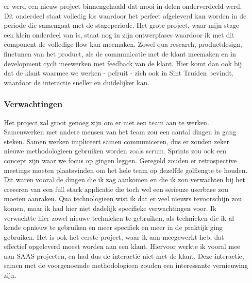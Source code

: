 er werd een nieuw project binnengehaald dat mooi in delen onderverdeeld werd. Dit
onderdeel staat volledig los waardoor het perfect afgeleverd kan worden in de periode die
samengaat met de stageperiode.
Het grote project, waar mijn stage een klein onderdeel van is, staat nog in zijn
ontwerpfases waardoor ik met dit component de volledige flow kan meemaken. Zowel qua
research, productdesign, finetunen van het product, als de communicatie met de klant
meemaken en in development cycli meewerken met feedback van de klant. Hier komt dan ook
bij dat de klant waarmee we werken - pcfruit - zich ook in Sint Truiden bevindt, waardoor
de interactie sneller en duidelijker kan.

\subsubsection {Verwachtingen}

Het project zal groot genoeg zijn om er met een team aan te werken. Samenwerken met
andere mensen van het team zou een aantal dingen in gang steken. Samen werken impliceert
samen communiceren, dus er zouden zeker nieuwe methodologieen gebruiken worden zoals
scrum. Sprints zou ook een concept zijn waar we focus op gingen leggen. Geregeld zouden
er retrospective meetings moeten plaatsvinden om het hele team op dezelfde golflengte te
houden. Dit waren vooral de dingen die ik zag aankomen en die ik zou verwachten bij het
creeeren van een full stack applicatie die toch wel een serieuze userbase zou moeten
aanraken.
Qua technologieen wist ik dat er veel nieuws tevoorschijn zou komen, maar ik had hier
niet dadelijk specifieke verwachtingen voor. Ik verwachtte hier zowel nieuwe technieken
te gebruiken, als technieken die ik al kende opnieuw te gebruiken en meer specifiek en
meer in de praktijk ging gebruiken.
Het is ook het eerste project, waar ik aan meegewerkt heb, dat effectief opgeleverd moest
worden aan een klant. Hiervoor werkte ik vooral mee aan SAAS projecten, en had dus de
interactie niet met de klant. Deze interactie, samen met de voorgenoemde methodologieen
zouden een interessante vernieuwing zijn.
